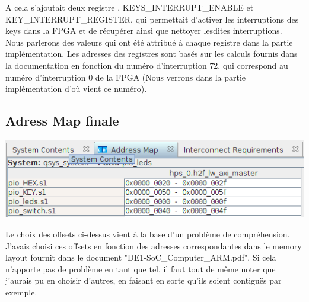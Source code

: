 A cela s'ajoutait deux registre , KEYS\_INTERRUPT\_ENABLE et\\ KEY\_INTERRUPT\_REGISTER, qui permettait d'activer les interruptions des keys dans la FPGA et de récupérer ainsi que nettoyer lesdites interruptions.\\

Nous parlerons des valeurs qui ont été attribué à chaque registre dans la partie implémentation. Les adresses des registres sont basés sur les calculs fournis dans la documentation en fonction du numéro d'interruption 72, qui correspond au numéro d'interruption 0 de la FPGA (Nous verrons dans la partie implémentation d'où vient ce numéro).

\subsection{Adress Map finale}

\includegraphics[scale=0.6]{./images/address_map.png}
\par
Le choix des offsets ci-dessus vient à la base d'un problème de compréhension. J'avais choisi ces offsets en fonction des adresses correspondantes dans le memory layout fournit dans le document "DE1-SoC\_Computer\_ARM.pdf". Si cela n'apporte pas de problème en tant que tel, il faut tout de même noter que j'aurais pu en choisir d'autres, en faisant en sorte qu'ils soient contiguës par exemple.

